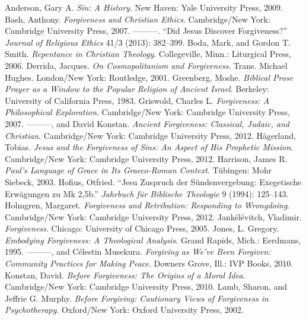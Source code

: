 \documentclass[titlepage]{article}
\begin{document}
\begingroup
\renewcommand{\section}[2]{}%
\begin{thebibliography}{99}

 Anderson, Gary A. \textit{Sin: A History}. New Haven: Yale University Press, 2009.
 Bash, Anthony. \textit{Forgiveness and Christian Ethics}. Cambridge/New York: Cambridge University Press, 2007.
 ———. “Did Jesus Discover Forgiveness?” \textit{Journal of Religious Ethics} 41/3 (2013): 382--399.
 Boda, Mark, and Gordon T. Smith. \textit{Repentance in Christian Theology}. Collegeville, Minn.: Liturgical Press, 2006.
 Derrida, Jacques. \textit{On Cosmopolitanism and Forgiveness}. Trans. Michael Hughes. London/New York: Routledge, 2001.
 Greenberg, Moshe. \textit{Biblical Prose Prayer as a Window to the Popular Religion of Ancient Israel}. Berkeley: University of California Press, 1983.
 Griswold, Charles L. \textit{Forgiveness: A Philosophical Exploration}. Cambridge/New York: Cambridge University Press, 2007.
 ———, and David Konstan. \textit{Ancient Forgiveness: Classical, Judaic, and Christian}. Cambridge/New York: Cambridge University Press, 2012.
 Hägerland, Tobias. \textit{Jesus and the Forgiveness of Sins: An Aspect of His Prophetic Mission}. Cambridge/New York: Cambridge University Press, 2012.
 Harrison, James R. \textit{Paul’s Language of Grace in Its Graeco-Roman Context}. Tübingen: Mohr Siebeck, 2003.
 Hofius, Otfried. “Jesu Zuspruch der Sündenvergebung: Exegetische Erwägungen zu Mk 2,5b.” \textit{Jahrbuch für Biblische Theologie} 9 (1994): 125--143.
 Holmgren, Margaret. \textit{Forgiveness and Retribution: Responding to Wrongdoing}. Cambridge/New York: Cambridge University Press, 2012.
 Jankélévitch, Vladimir. \textit{Forgiveness}. Chicago: University of Chicago Press, 2005.
 Jones, L. Gregory. \textit{Embodying Forgiveness: A Theological Analysis}. Grand Rapids, Mich.: Eerdmans, 1995.
 ———, and Célestin Musekura. \textit{Forgiving as We’ve Been Forgiven: Community Practices for Making Peace}. Downers Grove, Ill.: IVP Books, 2010.
 Konstan, David. \textit{Before Forgiveness: The Origins of a Moral Idea}. Cambridge/New York: Cambridge University Press, 2010.
 Lamb, Sharon, and Jeffrie G. Murphy. \textit{Before Forgiving: Cautionary Views of Forgiveness in Psychotherapy}. Oxford/New York: Oxford University Press, 2002.

\end{thebibliography}
\end{document}
